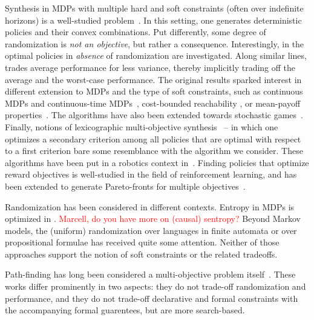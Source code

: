 Synthesis in MDPs with multiple hard and soft constraints (often over indefinite horizons) is a well-studied problem~\cite{DBLP:conf/stacs/ChatterjeeMH06,DBLP:conf/tacas/EtessamiKVY07,DBLP:conf/atva/ForejtKP12,DBLP:journals/fmsd/RandourRS17}.  In this setting, one generates deterministic policies and their convex combinations. Put differently, some degree of randomization is \emph{not an objective}, but rather a consequence. Interestingly, in \cite{DBLP:conf/tacas/DelgrangeKQR20} the optimal policies in \emph{absence} of randomization are investigated. Along similar lines, \cite{DBLP:journals/jcss/BrazdilCFK17} trades average performance for less variance, thereby implicitly trading off the average and the worst-case performance.  
The original results sparked interest in different extension to MDPs and the type of soft constraints, such as continuous MDPs \cite{DBLP:journals/csysl/HaesaertNS21} and continuous-time MDPs~\cite{DBLP:conf/cav/QuatmannJK17},  cost-bounded reachability \cite{DBLP:journals/jar/HartmannsJKQ20}, or mean-payoff properties~\cite{DBLP:journals/corr/abs-1104-3489}. 
The algorithms have also been extended towards stochastic games~\cite{DBLP:conf/mfcs/ChenFKSW13,DBLP:journals/sttt/KwiatkowskaPW18}.
Finally, notions of lexicographic multi-objective synthesis~\cite{DBLP:conf/cav/ChatterjeeKWW20} -- in which one optimizes a secondary criterion among all policies that are optimal with respect to a first criterion bare some resemblance with the algorithm we consider. 
These algorithms have been put in a robotics context in~\cite{DBLP:journals/ijrr/LacerdaFPH19}.
Finding policies that optimize reward objectives is well-studied in the field of reinforcement learning, and has been extended to generate Pareto-fronts for multiple objectives~\cite{DBLP:conf/icml/NatarajanT05,DBLP:conf/adprl/ParisiPSBR14}.

Randomization has been considered in different contexts. Entropy in MDPs is optimized in \cite{DBLP:journals/tac/SavasOCKT20}. 
\textcolor{red}{Marcell, do you have more on (causal) sentropy?}
Beyond Markov models, the (uniform) randomization over languages in finite automata \cite{DBLP:journals/siamcomp/HickeyC83,DBLP:conf/soda/KannanSM95} or over propositional formulae \cite{DBLP:journals/tcs/JerrumVV86,DBLP:journals/iandc/BellareGP00,DBLP:conf/dac/ChakrabortyMV14} has received quite some attention. Neither of those approaches support the notion of soft constraints or the related tradeoffs.

Path-finding has long been considered a multi-objective problem itself~\cite{DBLP:conf/icra/AmigoniG05,DBLP:journals/eswa/NazarahariKD19,DBLP:conf/icml/XuTMRSM20}.
These works differ prominently in two aspects: they do not trade-off randomization and performance, and they do not trade-off declarative and formal constraints with the accompanying formal guarentees, but are more search-based. 

